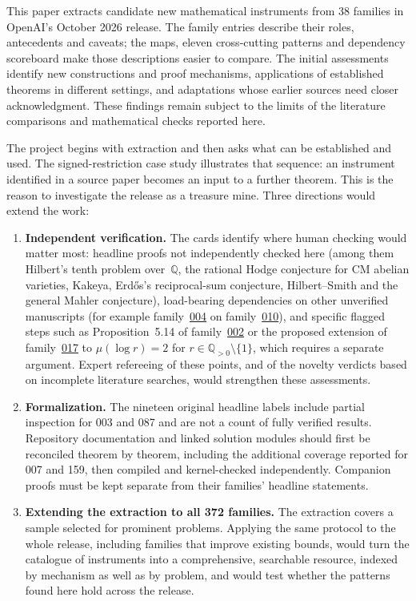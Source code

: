 \documentclass[11pt]{article}
\begin{document}
This paper extracts candidate new mathematical instruments from 38 families in OpenAI's October 2026 release. The family entries describe their roles, antecedents and caveats; the maps, eleven cross-cutting patterns and dependency scoreboard make those descriptions easier to compare. The initial assessments identify new constructions and proof mechanisms, applications of established theorems in different settings, and adaptations whose earlier sources need closer acknowledgment. These findings remain subject to the limits of the literature comparisons and mathematical checks reported here.

The project begins with extraction and then asks what can be established and used. The signed-restriction case study illustrates that sequence: an instrument identified in a source paper becomes an input to a further theorem. This is the reason to investigate the release as a treasure mine. Three directions would extend the work:
\begin{enumerate}[label=(\arabic*)]
\item \textbf{Independent verification.} The cards identify where human checking would matter most: headline proofs not independently checked here (among them Hilbert's tenth problem over~$\mathbb{Q}$, the rational Hodge conjecture for CM abelian varieties, Kakeya, Erd\H{o}s's reciprocal-sum conjecture, Hilbert--Smith and the general Mahler conjecture), load-bearing dependencies on other unverified manuscripts (for example family~\hyperref[fam:004]{004} on family~\hyperref[fam:010]{010}), and specific flagged steps such as Proposition~5.14 of family~\hyperref[fam:002]{002} or the proposed extension of family~\hyperref[fam:017]{017} to $\mu(\log r)=2$ for $r\in\mathbb Q_{>0}\setminus\{1\}$, which requires a separate argument. Expert refereeing of these points, and of the novelty verdicts based on incomplete literature searches, would strengthen these assessments.
\item \textbf{Formalization.} The nineteen original headline labels include partial inspection for 003 and 087 and are not a count of fully verified results. Repository documentation and linked solution modules should first be reconciled theorem by theorem, including the additional coverage reported for 007 and 159, then compiled and kernel-checked independently. Companion proofs must be kept separate from their families' headline statements.
\item \textbf{Extending the extraction to all 372 families.} The extraction covers a sample selected for prominent problems. Applying the same protocol to the whole release, including families that improve existing bounds, would turn the catalogue of instruments into a comprehensive, searchable resource, indexed by mechanism as well as by problem, and would test whether the patterns found here hold across the release.
\end{enumerate}
\end{document}
